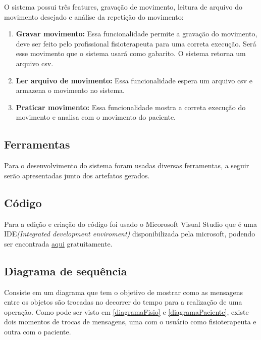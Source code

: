   O sistema possui três features, gravação de movimento, leitura de arquivo do movimento desejado e análise da repetição do movimento:
\begin{enumerate}
  \item \textbf{Gravar movimento:} Essa funcionalidade permite a gravação do movimento, deve ser feito pelo profissional fisioterapeuta
  para uma correta execução. Será esse movimento que o sistema usará como gabarito. O sistema retorna um arquivo csv.
  \item \textbf{Ler arquivo de movimento:} Essa funcionalidade espera um arquivo csv e armazena o movimento no sistema.
  \item \textbf{Praticar movimento:} Essa funcionalidade mostra a correta execução do movimento e analisa com o movimento do paciente.
\end{enumerate}

\subsection{Ferramentas}\label{sub:solFerramentas}
  Para o desenvolvimento do sistema foram usadas diversas ferramentas, a seguir serão apresentadas junto
dos artefatos gerados.

\subsection{Código}\label{sub:codigo}
  Para a edição e criação do código foi usado o Micorosoft Visual Studio que é uma IDE\textit{(Integrated development enviroment)} disponibilizada pela microsoft, podendo ser
encontrada \href{https://www.visualstudio.com/pt-br/?rr=https%3A%2F%2Fwww.google.com.br%2F}{aqui} gratuitamente.

\subsection{Diagrama de sequência}\label{sub:diagramaSequencia}
  Consiste em um diagrama que tem o objetivo de mostrar como as mensagens entre os objetos são trocadas no decorrer do tempo para a realização de uma operação.\cite{diagramaSequencia}
Como pode ser visto em \ref{diagramaFisio} e \ref{diagramaPaciente}, existe dois momentos de trocas de mensagens, uma com o usuário como fisioterapeuta e outra
com o paciente.

